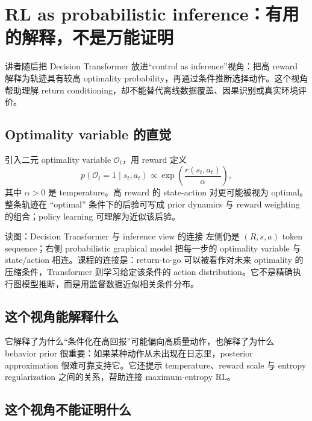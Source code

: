 \section{RL as probabilistic inference：有用的解释，不是万能证明}

讲者随后把 Decision Transformer 放进“control as inference”视角：把高 reward 解释为轨迹具有较高 optimality probability，再通过条件推断选择动作。这个视角帮助理解 return conditioning，却不能替代离线数据覆盖、因果识别或真实环境评价。

\subsection{Optimality variable 的直觉}

引入二元 optimality variable $\mathcal{O}_t$，用 reward 定义
\[
p(\mathcal{O}_t=1\mid s_t,a_t)\propto \exp\left(\frac{r(s_t,a_t)}{\alpha}\right),
\]
其中 $\alpha>0$ 是 temperature。高 reward 的 state-action 对更可能被视为 optimal。整条轨迹在 ``optimal'' 条件下的后验可写成 prior dynamics 与 reward weighting 的组合；policy learning 可理解为近似该后验。


\begin{knowledgebox}{读图：Decision Transformer 与 inference view 的连接}
左侧仍是 $(R,s,a)$ token sequence；右侧 probabilistic graphical model 把每一步的 optimality variable 与 state/action 相连。课程的连接是：return-to-go 可以被看作对未来 optimality 的压缩条件，Transformer 则学习给定该条件的 action distribution。它不是精确执行图模型推断，而是用监督数据近似相关条件分布。
\end{knowledgebox}

\subsection{这个视角能解释什么}

它解释了为什么“条件化在高回报”可能偏向高质量动作，也解释了为什么 behavior prior 很重要：如果某种动作从未出现在日志里，posterior approximation 很难可靠支持它。它还提示 temperature、reward scale 与 entropy regularization 之间的关系，帮助连接 maximum-entropy RL。

\subsection{这个视角不能证明什么}


